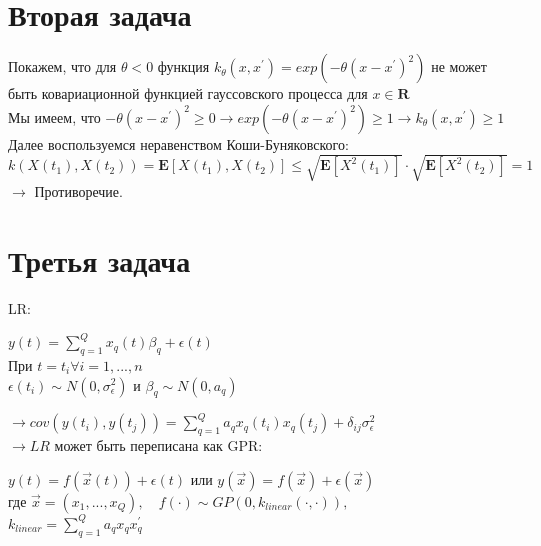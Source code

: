 \documentclass{article}
\begin{document}
\section{Вторая задача}
Покажем, что для $\theta < 0$ функция $k_{\theta}(x,x^{'}) = exp(-\theta(x - x^{'})^2)$ не может быть ковариационной функцией гауссовского процесса для $x \in \mathbf{R}$\\
Мы имеем, что $-\theta(x - x^{'})^2 \geq 0 \to exp(-\theta(x - x^{'})^2) \geq 1 \to k_{\theta}(x, x^{'}) \geq 1$\\
Далее воспользуемся неравенством Коши-Буняковского:\\
$k(X(t_1), X(t_2)) = \mathbf{E}[X(t_1),X(t_2)] \leq \sqrt{\mathbf{E}[X^2(t_1)]} \cdot \sqrt{\mathbf{E}[X^2(t_2)]} = 1$\\
$\to$ Противоречие.

\section{Третья задача}
LR:
\begin{center}
$y(t) = \sum\limits_{q=1}^{Q} x_q(t)\beta_{q} + \epsilon(t)$\\
При $t = t_{i} \forall i = 1,...,n$\\
$\epsilon(t_i) \sim N(0,\sigma_{\epsilon}^2)$ и $\beta_q \sim N(0,a_q)$\\
\end{center}
$\to cov(y(t_i), y(t_j)) = \sum\limits_{q=1}^{Q} a_q x_q(t_i)x_q(t_j) + \delta_{ij}\sigma_{\epsilon}^2$\\
$\to LR $ может быть переписана как GPR:
\begin{center}
$y(t) = f(\vec{x}(t)) + \epsilon(t)$ или $y(\vec{x}) = f(\vec{x}) + \epsilon(\vec{x})$\\
где $\vec{x} = (x_1,...,x_{Q}),\quad f(\cdot) \sim GP(0,k_{linear}(\cdot,\cdot)),$\\
$k_{linear} = \sum\limits_{q=1}^{Q}a_q x_q x_q^{'}$
\end{center}
\end{document}
